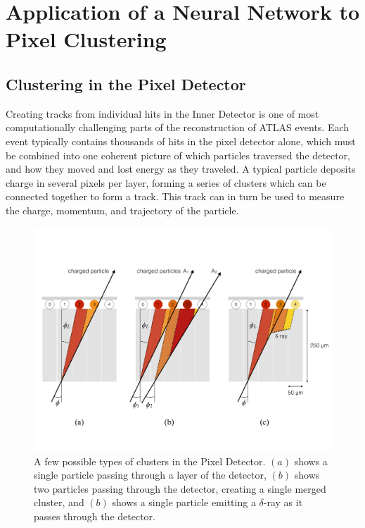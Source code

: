 
\chapter{Application of a Neural Network to Pixel Clustering} %

\label{sec:NN} %



\section{Clustering in the Pixel Detector}

Creating tracks from individual hits in the Inner Detector is one of most computationally challenging parts of the reconstruction of ATLAS events. Each event typically contains thousands of hits in the pixel detector alone, which must be combined into one coherent picture of which particles traversed the detector, and how they moved and lost energy as they traveled. A typical particle deposits charge in several pixels per layer, forming a series of clusters which can be connected together to form a track. This track can in turn be used to measure the charge, momentum, and trajectory of the particle. 


\begin{centering}
\begin{figure}[bth]
\myfloatalign
\includegraphics[width=.90\linewidth]{figures/nn/cluster_types.pdf}
\caption{A few possible types of clusters in the Pixel Detector. $(a)$ shows a single particle passing through a layer of the detector, $(b)$ shows two particles passing through the detector, creating a single merged cluster, and $(b)$ shows a single particle emitting a $\delta$-ray as it passes through the detector.}
\label{fig:cluster_types}
\end{figure}
\end{centering}

